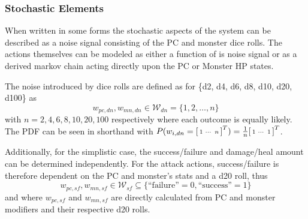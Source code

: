 \documentclass[9pt, onecolumn]{report}
\newcommand{\Z}{\mathbb{Z}}
\begin{document}
\subsubsection{Stochastic Elements}
When written in some forms the stochastic aspects of the system can be described as a noise signal consisting of the PC and monster dice rolls.
The actions themselves can be modeled as either a function of is noise signal or as a derived markov chain acting directly upon the PC or Monster HP states.

The noise introduced by dice rolls are defined as for \{d2, d4, d6, d8, d10, d20, d100\} as 
\[
    w_{pc,dn}, w_{mn,dn} \in \mathcal{W}_{dn} = \{1,2,\dots,n\}
\] with $n = 2,4,6,8,10,20,100$ respectively where each outcome is equally likely.
The PDF can be seen in shorthand with $P(w_{i,dn} = \smqty[1 & \cdots & n]^T) = \frac{1}{n}\smqty[1 & \cdots & 1]^T$.


Additionally, for the simplistic case, the success/failure and damage/heal amount can be determined independently.
For the attack actions, success/failure is therefore dependent on the PC and monster's stats and a d20 roll, thus \[
        w_{pc,sf}, w_{mn,sf} \in \mathcal{W}_{sf} \subseteq \{\text{``failure''} = 0, \text{``success''}=1\}
\] and where $w_{pc,sf}$ and $w_{mn,sf}$ are directly calculated from PC and monster modifiers and their respective d20 rolls.



\end{document}
